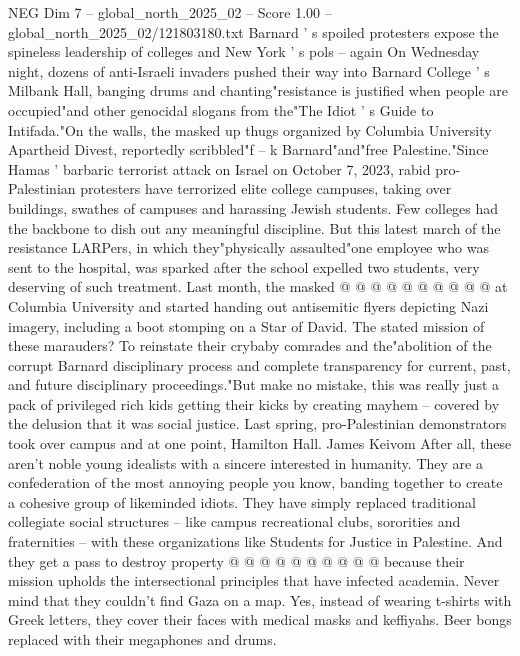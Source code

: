 \begin{textsample}{NEG Dim 7 – global\_north\_2025\_02 – Score 1.00 – global\_north\_2025\_02/121803180.txt}  \label{ex:f7_neg_178}
Barnard ' s spoiled protesters expose the spineless leadership of colleges and New York ' s pols -- again On Wednesday night, dozens of anti-Israeli invaders pushed their way into Barnard College ' s Milbank Hall, banging drums and chanting"resistance is justified when people are occupied"and other genocidal slogans from the"The Idiot ' s Guide to Intifada."On the walls, the masked up thugs organized by Columbia University Apartheid Divest, reportedly scribbled"f -- k Barnard"and"free Palestine."Since Hamas ' barbaric terrorist attack on Israel on October 7, 2023, rabid pro-Palestinian protesters have terrorized elite college campuses, taking over buildings, swathes of campuses and harassing Jewish students.
Few colleges had the backbone to dish out any meaningful discipline.
But this latest march of the resistance LARPers, in which they"physically assaulted"one employee who was sent to the hospital, was sparked after the school expelled two students, very deserving of such treatment.
Last month, the masked @ @ @ @ @ @ @ @ @ @ at Columbia University and started handing out antisemitic flyers depicting Nazi imagery, including a boot stomping on a Star of David.
The stated mission of these marauders?
To reinstate their crybaby comrades and the"abolition of the corrupt Barnard disciplinary process and complete transparency for current, past, and future disciplinary proceedings."But make no mistake, this was really just a pack of privileged rich kids getting their kicks by creating mayhem -- covered by the delusion that it was social justice.
Last spring, pro-Palestinian demonstrators took over campus and at one point, Hamilton Hall.
James Keivom After all, these aren't noble young idealists with a sincere interested in humanity.
They are a confederation of the most annoying people you know, banding together to create a cohesive group of likeminded idiots.
They have simply replaced traditional collegiate social structures -- like campus recreational clubs, sororities and fraternities -- with these organizations like Students for Justice in Palestine.
And they get a pass to destroy property @ @ @ @ @ @ @ @ @ @ because their mission upholds the intersectional principles that have infected academia.
Never mind that they couldn't find Gaza on a map.
Yes, instead of wearing t-shirts with Greek letters, they cover their faces with medical masks and keffiyahs.
Beer bongs replaced with their megaphones and drums.

\end{textsample}
